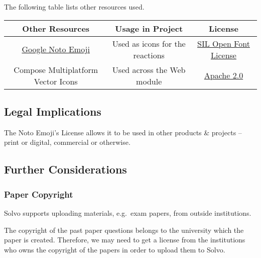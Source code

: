 \documentclass[a4paper]{article}
\begin{document}
    The following table lists other resources used.

    \begin{table}[H]
        \begin{tabular}{c|c|c}
            Other Resources                                                             & Usage in Project                & License                                                                                         \\
            \hline
            \href{https://fonts.google.com/noto/specimen/Noto+Emoji}{Google Noto Emoji} & Used as icons for the reactions & \href{https://scripts.sil.org/cms/scripts/page.php?site_id=nrsi\&         id=OFL}{SIL Open Font License} \\
            Compose Multiplatform Vector Icons                                          & Used across the Web module      & \href{https://github.com/JetBrains/compose-multiplatform/blob/master/LICENSE.txt}{Apache 2.0}   \\
        \end{tabular}
    \end{table}

    \subsection*{Legal Implications}

    The Noto Emoji's License allows it to be used in other products \& projects – print or digital, commercial or otherwise.

    \subsection*{Further Considerations}

    \subsubsection*{Paper Copyright}

    Solvo supports uploading materials, e.g.\ exam papers, from outside institutions.

    The copyright of the past paper questions belongs to the university which the paper is created.
    Therefore, we may need to get a license from the institutions who owns the copyright of the papers in order to upload them to Solvo.
\end{document}
